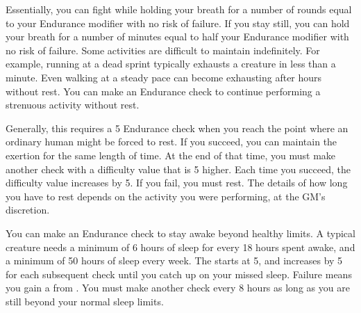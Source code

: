         Essentially, you can fight while holding your breath for a number of rounds equal to your Endurance modifier with no risk of failure.
        If you stay still, you can hold your breath for a number of minutes equal to half your Endurance modifier with no risk of failure.
        \label{Maintain Exertion}
        Some activities are difficult to maintain indefinitely.
        For example, running at a dead sprint typically exhausts a creature in less than a minute.
        Even walking at a steady pace can become exhausting after hours without rest.
        You can make an Endurance check to continue performing a strenuous activity without rest.

        Generally, this requires a  5 Endurance check when you reach the point where an ordinary human might be forced to rest.
        If you succeed, you can maintain the exertion for the same length of time.
        At the end of that time, you must make another check with a difficulty value that is 5 higher.
        Each time you succeed, the difficulty value increases by 5.
        If you fail, you must rest.
        The details of how long you have to rest depends on the activity you were performing, at the GM's discretion.

        \label{Stay Awake} You can make an Endurance check to stay awake beyond healthy limits.
        A typical creature needs a minimum of 6 hours of sleep for every 18 hours spent awake, and a minimum of 50 hours of sleep every week.
        The  starts at 5, and increases by 5 for each subsequent check until you catch up on your missed sleep.
        Failure means you gain a  from .
        You must make another check every 8 hours as long as you are still beyond your normal sleep limits.



